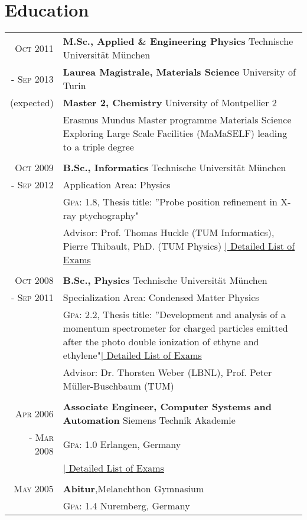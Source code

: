 \documentclass[a4paper,10pt]{article}
\begin{document}
\section{Education}
\begin{tabularx}{19cm}{rX}	

\textsc{Oct 2011}& \textbf{M.Sc., Applied \& Engineering Physics} \hfill{Technische Universität München}\\
\textsc{- Sep 2013} & \textbf{Laurea Magistrale, Materials Science} \hfill{University of Turin}\\
 (expected)&  \textbf{Master 2, Chemistry} \hfill{University of Montpellier 2}\\
 & \small{Erasmus Mundus Master programme Materials Science Exploring Large Scale Facilities (MaMaSELF) leading to a
triple degree}\\\\

\textsc{Oct 2009}& \textbf{B.Sc., Informatics} \hfill{Technische Universität München}\\
\textsc{- Sep 2012} & Application Area: Physics\\
 & \textsc{Gpa}: 1.8, \small{Thesis title: ”Probe position refinement in X-ray ptychography"}\\
& Advisor: Prof. Thomas Huckle (TUM Informatics), Pierre Thibault, PhD. (TUM Physics)
\hyperlink{grds_studies}{\hfill |\footnotesize{ Detailed List of Exams}}
\\\\

\textsc{Oct 2008}& \textbf{B.Sc.,  Physics} \hfill\normalsize{Technische Universität München}\\
 \textsc{- Sep 2011}& Specialization Area: Condensed Matter Physics \\
& \textsc{Gpa}: 2.2, \small{Thesis title: ”Development and analysis of a momentum spectrometer for charged particles emitted after the photo double ionization of ethyne and ethylene"}\hyperlink{physicsBSC}{\hfill |\footnotesize{ Detailed List of Exams}}\\
& Advisor: Dr. Thorsten Weber (LBNL),  Prof. Peter Müller-Buschbaum (TUM) \\\\


\textsc{Apr 2006}& \textbf{Associate Engineer, Computer Systems and Automation} \hfill  {Siemens Technik Akademie}\\
\textsc{- Mar 2008}& \textsc{Gpa}: 1.0  \hfill Erlangen, Germany\\
 &\hyperlink{grds_siemens}{\hfill| \footnotesize Detailed List of Exams}\\ \\

\textsc{May} 2005& \textbf{Abitur},\hfill  Melanchthon Gymnasium \\
&  \textsc{Gpa}: 1.4 \hfill Nuremberg, Germany

\end{tabularx}
\end{document}
